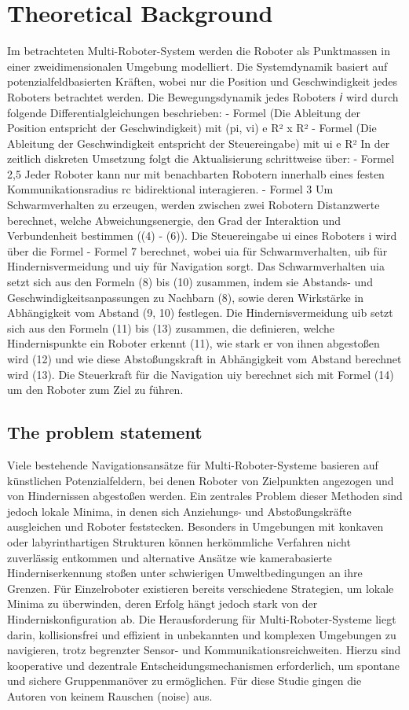 \documentclass[conference]{IEEEtran}
\begin{document}
\section{Theoretical Background}
Im betrachteten Multi-Roboter-System werden die Roboter als Punktmassen in einer zweidimensionalen Umgebung modelliert. Die Systemdynamik basiert auf potenzialfeldbasierten Kräften, wobei nur die Position und Geschwindigkeit jedes Roboters betrachtet werden. Die Bewegungsdynamik jedes Roboters 𝑖 wird durch folgende Differentialgleichungen beschrieben:
-	Formel (Die Ableitung der Position entspricht der Geschwindigkeit) mit (pi, vi) e R² x R²
-	Formel (Die Ableitung der Geschwindigkeit entspricht der Steuereingabe) mit ui e R²
In der zeitlich diskreten Umsetzung folgt die Aktualisierung schrittweise über:
-	Formel 2,5
Jeder Roboter kann nur mit benachbarten Robotern innerhalb eines festen Kommunikationsradius rc bidirektional interagieren.
-	Formel 3
Um Schwarmverhalten zu erzeugen, werden zwischen zwei Robotern Distanzwerte berechnet, welche Abweichungsenergie, den Grad der Interaktion und Verbundenheit bestimmen ((4) - (6)).
Die Steuereingabe ui eines Roboters i wird über die Formel
-	Formel 7
berechnet, wobei uia für Schwarmverhalten, uib für Hindernisvermeidung und uiy für Navigation sorgt. Das Schwarmverhalten uia setzt sich aus den Formeln (8) bis (10) zusammen, indem sie Abstands- und Geschwindigkeitsanpassungen zu Nachbarn (8), sowie deren Wirkstärke in Abhängigkeit vom Abstand (9, 10) festlegen. Die Hindernisvermeidung uib setzt sich aus den Formeln (11) bis (13) zusammen, die definieren, welche Hindernispunkte ein Roboter erkennt (11), wie stark er von ihnen abgestoßen wird (12) und wie diese Abstoßungskraft in Abhängigkeit vom Abstand berechnet wird (13). Die Steuerkraft für die Navigation uiy berechnet sich mit Formel (14) um den Roboter zum Ziel zu führen.


\subsection{The problem statement}
Viele bestehende Navigationsansätze für Multi-Roboter-Systeme basieren auf künstlichen Potenzialfeldern, bei denen Roboter von Zielpunkten angezogen und von Hindernissen abgestoßen werden. Ein zentrales Problem dieser Methoden sind jedoch lokale Minima, in denen sich Anziehungs- und Abstoßungskräfte ausgleichen und Roboter feststecken. Besonders in Umgebungen mit konkaven oder labyrinthartigen Strukturen können herkömmliche Verfahren nicht zuverlässig entkommen und alternative Ansätze wie kamerabasierte Hinderniserkennung stoßen unter schwierigen Umweltbedingungen an ihre Grenzen. Für Einzelroboter existieren bereits verschiedene Strategien, um lokale Minima zu überwinden, deren Erfolg hängt jedoch stark von der Hinderniskonfiguration ab. Die Herausforderung für Multi-Roboter-Systeme liegt darin, kollisionsfrei und effizient in unbekannten und komplexen Umgebungen zu navigieren, trotz begrenzter Sensor- und Kommunikationsreichweiten. Hierzu sind kooperative und dezentrale Entscheidungsmechanismen erforderlich, um spontane und sichere Gruppenmanöver zu ermöglichen. Für diese Studie gingen die Autoren von keinem Rauschen (noise) aus.
\end{document}
